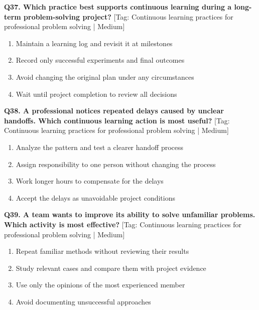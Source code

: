 \noindent\textbf{Q37. Which practice best supports continuous learning during a long-term problem-solving project?} \hfill [Tag: Continuous learning practices for professional problem solving | Medium]
\begin{enumerate}[label=(\alph*),topsep=2pt,itemsep=1pt,partopsep=0pt,parsep=0pt]
    \item {Maintain a learning log and revisit it at milestones}
    \item {Record only successful experiments and final outcomes}
    \item {Avoid changing the original plan under any circumstances}
    \item {Wait until project completion to review all decisions}
\end{enumerate}
\vspace{2mm}

\noindent\textbf{Q38. A professional notices repeated delays caused by unclear handoffs. Which continuous learning action is most useful?} \hfill [Tag: Continuous learning practices for professional problem solving | Medium]
\begin{enumerate}[label=(\alph*),topsep=2pt,itemsep=1pt,partopsep=0pt,parsep=0pt]
    \item {Analyze the pattern and test a clearer handoff process}
    \item {Assign responsibility to one person without changing the process}
    \item {Work longer hours to compensate for the delays}
    \item {Accept the delays as unavoidable project conditions}
\end{enumerate}
\vspace{2mm}

\noindent\textbf{Q39. A team wants to improve its ability to solve unfamiliar problems. Which activity is most effective?} \hfill [Tag: Continuous learning practices for professional problem solving | Medium]
\begin{enumerate}[label=(\alph*),topsep=2pt,itemsep=1pt,partopsep=0pt,parsep=0pt]
    \item {Repeat familiar methods without reviewing their results}
    \item {Study relevant cases and compare them with project evidence}
    \item {Use only the opinions of the most experienced member}
    \item {Avoid documenting unsuccessful approaches}
\end{enumerate}
\vspace{2mm}

